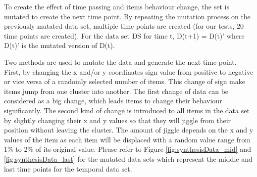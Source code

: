 To create the effect of time passing and items behaviour change, the set is mutated to create the next time point. By repeating the mutation process on the previously mutated data set, multiple time points are created (for our tests, 20 time points are created). For the data set DS for time t, D(t+1) = D(t)' where D(t)' is the mutated version of D(t). 

Two methods are used to mutate the data and generate the next time point. First, by changing the x and/or y coordinates sign value from positive to negative or vice versa of a randomly selected number of items. This change of sign make items jump from one cluster into another. The first change of data can be considered as a big change, which leads items to change their behaviour significantly. The second kind of change is introduced to all items in the data set by slightly changing their x and y values so that they will jiggle from their position without leaving the cluster. The amount of jiggle depends on the x and y values of the item as each item will be displaced with a random value range from 1\% to 2\% of its original value. Please refer to Figure \ref{fig:synthesisData_mid} and \ref{fig:synthesisData_last} for the mutated data sets which represent the middle and last time points for the temporal data set.


